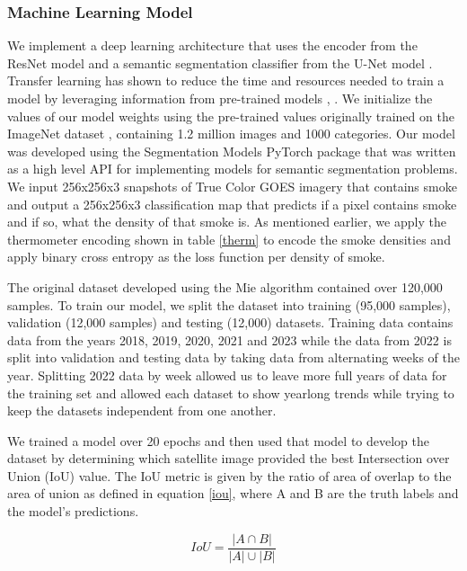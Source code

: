 \documentclass{ametsocV6.1}
\begin{document}
\subsubsection*{Machine Learning Model} 

We implement a deep learning architecture that uses the encoder from the ResNet model \cite{resnet} and a semantic segmentation classifier from the U-Net model \cite{unet}. Transfer learning has shown to reduce the time and resources needed to train a model by leveraging information from pre-trained models \cite{transfer}, \cite{transfer2}.  We initialize the values of our model weights using the pre-trained values originally trained on the ImageNet dataset \cite{imgnet}, containing 1.2 million images and 1000 categories. Our model was developed using the Segmentation Models PyTorch package \cite{semantic} that was written as a high level API for implementing models for semantic segmentation problems.  We input 256x256x3 snapshots of True Color GOES imagery that contains smoke and output a 256x256x3 classification map that predicts if a pixel contains smoke and if so, what the density of that smoke is. As mentioned earlier, we apply the thermometer encoding shown in table \ref{therm} to encode the smoke densities and apply binary cross entropy as the loss function per density of smoke. 

The original dataset developed using the Mie algorithm contained over 120,000 samples. To train our model, we split the dataset into training (95,000 samples), validation (12,000 samples) and testing (12,000) datasets. Training data contains data from the years 2018, 2019, 2020, 2021 and 2023 while the data from 2022 is split into validation and testing data by taking data from alternating weeks of the year. Splitting 2022 data by week allowed us to leave more full years of data for the training set and allowed each dataset to show yearlong trends while trying to keep the datasets independent from one another.

We trained a model over 20 epochs and then used that model to develop the dataset by determining which satellite image provided the best Intersection over Union (IoU) value. The IoU metric is given by the ratio of area of overlap to the area of union as defined in equation \ref{iou}, where A and B are the truth labels and the model's predictions.

\begin{equation} \label{iou}
    IoU = \frac{| A \cap B|}{|A|\cup|B|}
\end{equation}
\end{document}

